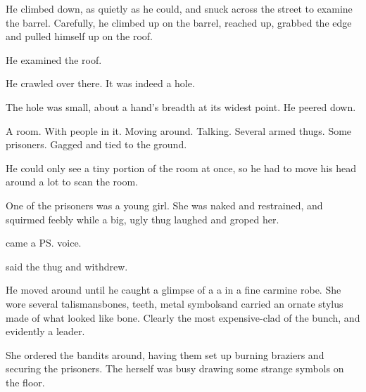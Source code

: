 He climbed down, as quietly as he could, and snuck across the street to examine the barrel. 
Carefully, he climbed up on the barrel, reached up, grabbed the edge and pulled himself up on the roof. 


He examined the roof. 

He crawled over there. 
It was indeed a hole. 


The hole was small, about a hand's breadth at its widest point. 
He peered down. 

A room. 
With people in it. 
Moving around. 
Talking. 
Several armed thugs. 
Some prisoners. 
Gagged and tied to the ground. 


He could only see a tiny portion of the room at once, so he had to move his head around a lot to scan the room. 

One of the prisoners was a young \human{} girl. 
She was naked and restrained, and squirmed feebly while a big, ugly \human{} thug laughed and groped her. 

 came a \ps{\sphyle} voice. 

 said the thug and withdrew. 


He moved around until he caught a glimpse of a a \sphyle{} in a fine carmine robe. 
She wore several talismans\dash bones, teeth, metal symbols\dash and carried an ornate stylus made of what looked like bone. 
Clearly the most expensive-clad of the bunch, and evidently a leader. 


She ordered the bandits around, having them set up burning braziers and securing the prisoners. 
The \sphyle{} herself was busy drawing some strange symbols on the floor. 








